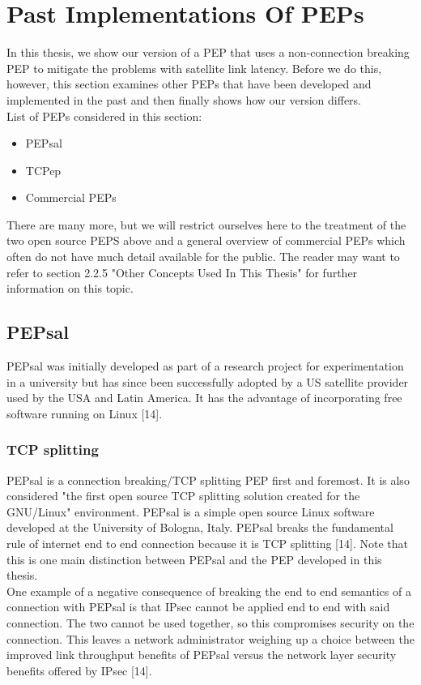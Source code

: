 \documentclass{uathesis}
\begin{document}
        
\section{Past Implementations Of PEPs}

In this thesis, we show our version of a PEP that uses a non-connection breaking PEP to mitigate the problems with satellite link latency. Before we do this, however, this section examines other PEPs that have been developed and implemented in the past and then finally shows how our version differs.\\
 
List of PEPs considered in this section:
 \begin{itemize}
 \item PEPsal
 \item TCPep
 \item Commercial PEPs
 \end{itemize}
There are many more, but we will restrict ourselves here to the treatment of the two open source PEPS above and a general overview of commercial PEPs which often do not have much detail available for the public. The reader may want to refer to section 2.2.5 "Other Concepts Used In This Thesis" for further information on this topic.

\subsection{PEPsal}
PEPsal was initially developed as part of a research project for experimentation in a university but has since been successfully adopted by a US satellite provider used by the USA and Latin America. It has the advantage of incorporating free software running on Linux [14].

\subsubsection*{TCP splitting}
PEPsal is a connection breaking/TCP splitting PEP first and foremost. It is also considered "the first open source TCP splitting solution created for the GNU/Linux" environment. PEPsal is a simple open source Linux software developed at the University of Bologna, Italy. PEPsal breaks the fundamental rule of internet end to end connection because it is TCP splitting [14]. Note that this is one main distinction between PEPsal and the PEP developed in this thesis. \\

One example of a negative consequence of breaking the end to end semantics of a connection with PEPsal is that IPsec cannot be applied end to end with said connection. The two cannot be used together, so this compromises security on the connection. This leaves a network administrator weighing up a choice between the improved link throughput benefits of PEPsal versus the network layer security benefits offered by IPsec [14].
\end{document}
